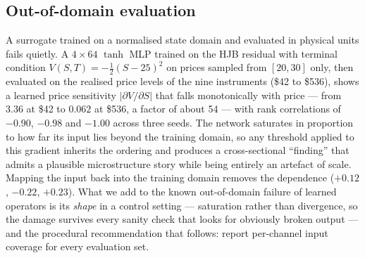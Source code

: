 \documentclass[conference]{IEEEtran}
\begin{document}
\subsection{Out-of-domain evaluation}\label{sec:ood}
A surrogate trained on a normalised state domain and evaluated in physical units fails quietly. A
$4\times64$ $\tanh$ MLP trained on the HJB residual with terminal condition
$V(S,T) = -\tfrac{1}{2}(S-25)^2$ on prices sampled from $[20,30]$ only, then evaluated on the
realised price levels of the nine instruments (\$42 to \$536), shows a learned price sensitivity
$|\partial V/\partial S|$ that falls monotonically with price --- from $3.36$ at \$42 to $0.062$ at
\$536, a factor of about 54 --- with rank correlations of $-0.90$, $-0.98$ and $-1.00$ across three
seeds. The network saturates in proportion to how far its input lies beyond the training domain, so
any threshold applied to this gradient inherits the ordering and produces a cross-sectional
``finding'' that admits a plausible microstructure story while being entirely an artefact of scale.
Mapping the input back into the training domain removes the dependence ($+0.12$, $-0.22$, $+0.23$).
What we add to the known out-of-domain failure of learned operators \cite{chandra2024uncertainty}
is its \emph{shape} in a control setting --- saturation rather than divergence, so the damage
survives every sanity check that looks for obviously broken output --- and the procedural
recommendation that follows: report per-channel input coverage for every evaluation set.
\end{document}
